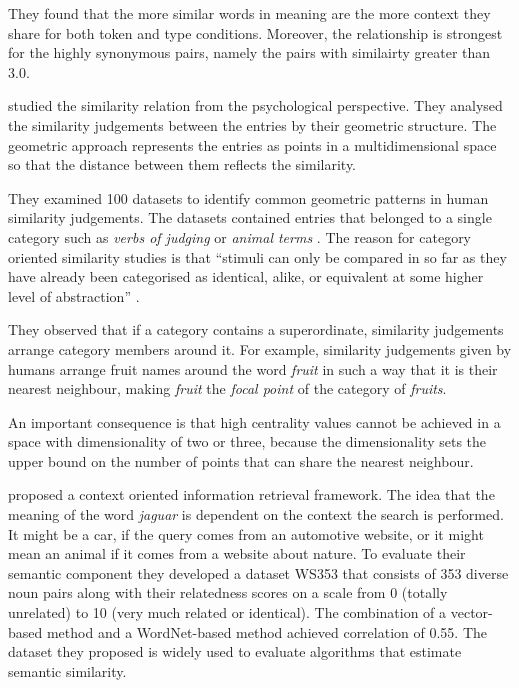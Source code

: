 They found that the more similar words in meaning are the more context they share for both token and type conditions. Moreover, the relationship is strongest for the highly synonymous pairs, namely the pairs with similairty greater than 3.0.

 studied the similarity relation from the psychological perspective. They analysed the similarity judgements between the entries by their geometric structure. The geometric approach represents the entries as points in a multidimensional space so that the distance between them reflects the similarity.

They examined 100 datasets to identify common geometric patterns in human similarity judgements. The datasets contained entries that belonged to a single category such as \textit{verbs of judging} \cite{FILLENBAUM197454} or \textit{animal terms} \cite{HENLEY1969176}. The reason for category oriented similarity studies is that ``stimuli can only be compared in so far as they have already been categorised as identical, alike, or equivalent at some higher level of abstraction'' \cite{turner1987rediscovering}.

They observed that if a category contains a superordinate, similarity judgements arrange category members around it. For example, similarity judgements given by humans arrange fruit names around the word \textit{fruit} in such a way that it is their nearest neighbour, making \textit{fruit} the \emph{focal point} of the category of \textit{fruits}.

An important consequence is that high centrality values cannot be achieved in a space with dimensionality of two or three,  because the dimensionality sets the upper bound on the number of points that can share the nearest neighbour.



 proposed a context oriented information retrieval framework. The idea that the meaning of the word \textit{jaguar} is dependent on the context the search is performed. It might be a car, if the query comes from an automotive website, or it might mean an animal if it comes from a website about nature. To evaluate their semantic component they developed a dataset WS353 that consists of 353 diverse noun pairs along with their relatedness scores on a scale from 0 (totally unrelated) to 10 (very much related or identical). The combination of a vector-based method and a WordNet-based method achieved correlation of 0.55. The dataset they proposed is widely used to evaluate algorithms that estimate semantic similarity.


